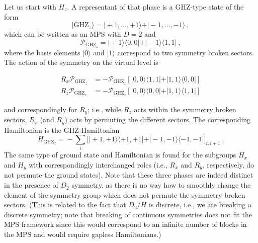 \documentclass[twocolumn,superscriptaddress,prb,linenumbers]{revtex4-1}
\newcommand{\ket}[1]{\vert#1\rangle}
\newcommand{\bra}[1]{\langle#1\vert}
\newcommand{\mc}[1]{\mathcal{#1}}
\begin{document}
Let us start with $H_z$. A representant of that phase is a GHZ-type state
of the form
\[
    \ket{\mathrm{GHZ}_z} = \ket{+1,\dots,+1} + \ket{-1,\dots,-1}\ ,
\]
which can be written as an MPS with $D=2$ and
\[
    \mc P_{\mathrm{GHZ}_z} = \ket{+1} \bra{0,0} + \ket{-1}\bra{1,1}\ ,
\]
where the basis elements $\ket{0}$ and $\ket{1}$ correspond to two
symmetry broken sectors.  The action of the symmetry on the virtual level
is
\begin{linenomath}
    \begin{align*}
        R_x\mc P_{\mathrm{GHZ}_z} & =
        -\mc P_{\mathrm{GHZ}_z}\left[ \ket{0,0}\bra{1,1}+\ket{1,1}\bra{0,0}\right] \\
        R_z\mc P_{\mathrm{GHZ}_z} & =
        -\mc P_{\mathrm{GHZ}_z}\left[ \ket{0,0}\bra{0,0}+\ket{1,1}\bra{1,1}\right]
    \end{align*}
\end{linenomath}
and correspondingly for $R_y$; i.e., while $R_z$ acts within the symmetry
broken sectors, $R_x$ (and $R_y$) acts by permuting the different sectors.
The corresponding Hamiltonian is the GHZ Hamiltonian
\[
    H_{\mathrm{GHZ}_z} =\! -\!\sum_i \big[
        \ket{+1,+1}\bra{+1,+1}+ \ket{-1,-1}\bra{-1,-1}
        \big]_{i,i+1} \ .
\]
The same type of ground state and Hamiltonian is found for the subgroups
$H_x$ and $H_y$ with correspondingly
interchanged roles (i.e., $R_x$ and $R_y$, respectively, do not permute
the ground states).  Note that these three phases are indeed distinct in
the presence of $D_2$ symmetry, as there is no way how to smoothly change
the element of the symmetry group which does not permute the symmetry
broken sectors. (This is related to the fact that $D_2/H$ is discrete,
i.e., we are breaking a discrete symmetry; note that breaking of
continuous symmetries does not fit the MPS framework since this would
correspond to an infinite number of blocks in the MPS and would
require gapless Hamiltonians.)
\end{document}

